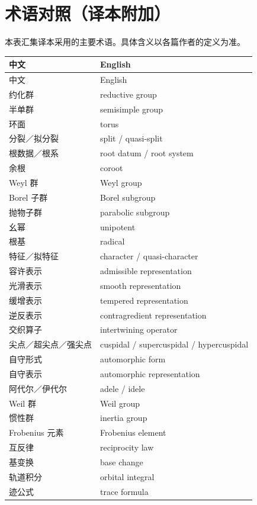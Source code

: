 \chapter*{术语对照（译本附加）}
本表汇集译本采用的主要术语。具体含义以各篇作者的定义为准。
\begin{longtable}{@{}p{}p{}@{}}
\toprule 中文 & English \\\midrule\endfirsthead
\toprule 中文 & English \\\midrule\endhead
\bottomrule\endfoot
约化群 & reductive group \\
半单群 & semisimple group \\
环面 & torus \\
分裂／拟分裂 & split / quasi-split \\
根数据／根系 & root datum / root system \\
余根 & coroot \\
Weyl 群 & Weyl group \\
Borel 子群 & Borel subgroup \\
抛物子群 & parabolic subgroup \\
幺幂 & unipotent \\
根基 & radical \\
特征／拟特征 & character / quasi-character \\
容许表示 & admissible representation \\
光滑表示 & smooth representation \\
缓增表示 & tempered representation \\
逆反表示 & contragredient representation \\
交织算子 & intertwining operator \\
尖点／超尖点／强尖点 & cuspidal / supercuspidal / hypercuspidal \\
自守形式 & automorphic form \\
自守表示 & automorphic representation \\
阿代尔／伊代尔 & adele / idele \\
Weil 群 & Weil group \\
惯性群 & inertia group \\
Frobenius 元素 & Frobenius element \\
互反律 & reciprocity law \\
基变换 & base change \\
轨道积分 & orbital integral \\
迹公式 & trace formula \\

\end{longtable}
